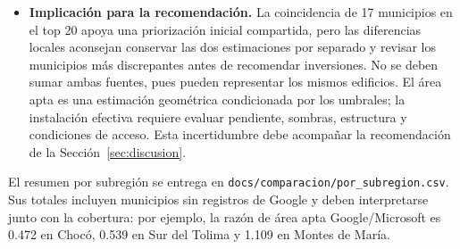 \begin{itemize}
  \item \textbf{Implicación para la recomendación.} La coincidencia de 17 municipios en el top 20 apoya una priorización inicial compartida, pero las diferencias locales aconsejan conservar las dos estimaciones por separado y revisar los municipios más discrepantes antes de recomendar inversiones. No se deben sumar ambas fuentes, pues pueden representar los mismos edificios. El área apta es una estimación geométrica condicionada por los umbrales; la instalación efectiva requiere evaluar pendiente, sombras, estructura y condiciones de acceso. Esta incertidumbre debe acompañar la recomendación de la Sección~\ref{sec:discusion}.
\end{itemize}

\noindent El resumen por subregión se entrega en \texttt{docs/comparacion/por\_subregion.csv}. Sus totales incluyen municipios sin registros de Google y deben interpretarse junto con la cobertura: por ejemplo, la razón de área apta Google/Microsoft es 0.472 en Chocó, 0.539 en Sur del Tolima y 1.109 en Montes de María.

